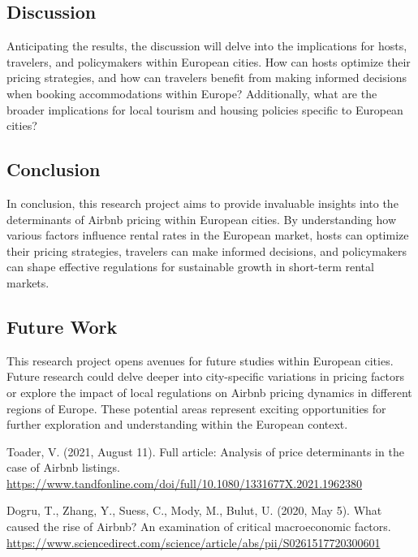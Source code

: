 \documentclass[12pt, letterpaper]{article}
\begin{document}
\subsection*{Discussion}
Anticipating the results, the discussion will delve into the implications for hosts, travelers, and policymakers within European cities. How can hosts optimize their pricing strategies, and how can travelers benefit from making informed decisions when booking accommodations within Europe? Additionally, what are the broader implications for local tourism and housing policies specific to European cities?

\subsection*{Conclusion}
In conclusion, this research project aims to provide invaluable insights into the determinants of Airbnb pricing within European cities. By understanding how various factors influence rental rates in the European market, hosts can optimize their pricing strategies, travelers can make informed decisions, and policymakers can shape effective regulations for sustainable growth in short-term rental markets.

\subsection*{Future Work}
This research project opens avenues for future studies within European cities. Future research could delve deeper into city-specific variations in pricing factors or explore the impact of local regulations on Airbnb pricing dynamics in different regions of Europe. These potential areas represent exciting opportunities for further exploration and understanding within the European context.

\begin{thebibliography}{}

Toader, V. (2021, August 11). Full article: Analysis of price determinants in the case of Airbnb listings.
\url{https://www.tandfonline.com/doi/full/10.1080/1331677X.2021.1962380} 

Dogru, T., Zhang, Y., Suess, C., Mody, M., Bulut, U. (2020, May 5).
What caused the rise of Airbnb? An examination of critical macroeconomic factors.
\url{https://www.sciencedirect.com/science/article/abs/pii/S0261517720300601} 

\end{thebibliography}
\end{document}
